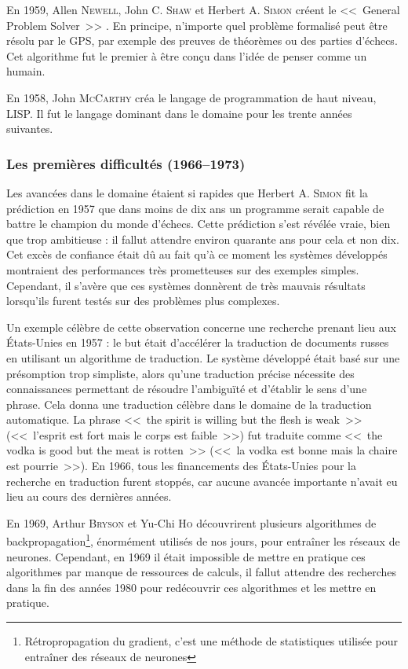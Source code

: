 En 1959, Allen \textsc{Newell}, John C. \textsc{Shaw} et Herbert A. \textsc{Simon} créent le <<~General Problem Solver~>> \cite{newell_1959}.
En principe, n'importe quel problème formalisé peut être résolu par le GPS, par exemple des preuves de théorèmes ou des parties d'échecs.
Cet algorithme fut le premier à être conçu dans l'idée de penser comme un humain.

En 1958, John \textsc{McCarthy} créa le langage de programmation de haut niveau, LISP.
Il fut le langage dominant dans le domaine pour les trente années suivantes.

\subsubsection{Les premières difficultés (1966–1973)}

Les avancées dans le domaine étaient si rapides que Herbert A. \textsc{Simon} fit la prédiction en 1957 que dans moins de dix ans un programme serait capable de battre le champion du monde d'échecs.
Cette prédiction s'est révélée vraie, bien que trop ambitieuse : il fallut attendre environ quarante ans pour cela et non dix.
Cet excès de confiance était dû au fait qu'à ce moment les systèmes développés montraient des performances très prometteuses sur des exemples simples.
Cependant, il s'avère que ces systèmes donnèrent de très mauvais résultats lorsqu'ils furent testés sur des problèmes plus complexes.

Un exemple célèbre de cette observation concerne une recherche prenant lieu aux États-Unies en 1957 : le but était d'accélérer la traduction de documents russes en utilisant un algorithme de traduction.
Le système développé était basé sur une présomption trop simpliste, alors qu'une traduction précise nécessite des connaissances permettant de résoudre l'ambiguïté et d'établir le sens d'une phrase.
Cela donna une traduction célèbre dans le domaine de la traduction automatique.
La phrase <<~the spirit is willing but the flesh is weak~>> (<<~l'esprit est fort mais le corps est faible~>>) fut traduite comme <<~the vodka is good but the meat is rotten~>> (<<~la vodka est bonne mais la chaire est pourrie~>>).
En 1966, tous les financements des États-Unies pour la recherche en traduction furent stoppés, car aucune avancée importante n'avait eu lieu au cours des dernières années.

En 1969, Arthur \textsc{Bryson} et Yu-Chi \textsc{Ho} \cite{bryson_ho} découvrirent plusieurs algorithmes de backpropagation\footnote{Rétropropagation du gradient, c'est une méthode de statistiques utilisée pour entraîner des réseaux de neurones}, énormément utilisés de nos jours, pour entraîner les réseaux de neurones.
Cependant, en 1969 il était impossible de mettre en pratique ces algorithmes par manque de ressources de calculs, il fallut attendre des recherches dans la fin des années 1980 pour redécouvrir ces algorithmes et les mettre en pratique.

